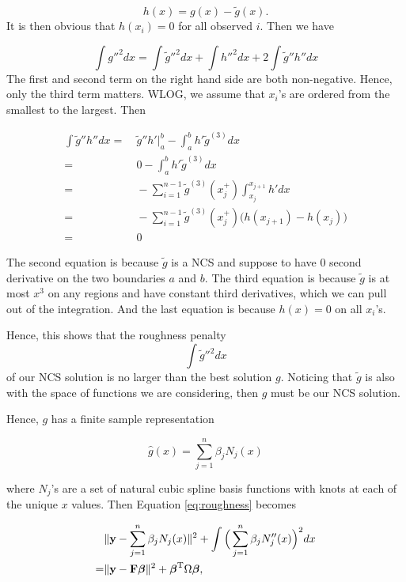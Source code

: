 \documentclass[
]{book}
\def\bF{{\bf F}}
\theoremstyle{definition}
\theoremstyle{definition}
\theoremstyle{definition}
\theoremstyle{definition}
\theoremstyle{remark}
\begin{document}
\[h(x) = g(x) - \tilde{g}(x).\]
It is then obvious that \(h(x_i) = 0\) for all observed \(i\). Then we have

\[\int g''^2 dx = \int \widetilde{g}''^2 dx + \int h''^2 dx + 2 \int \widetilde{g}'' h'' dx\]
The first and second term on the right hand side are both non-negative. Hence, only the third term matters. WLOG, we assume that \(x_i\)'s are ordered from the smallest to the largest. Then

\begin{align}
\int \tilde{g}'' h'' dx =& ~\tilde{g}'' h' \Big|_a^b - \int_a^b h' \tilde{g}^{(3)} dx \nonumber \\
=&~ 0 - \int_a^b h' \tilde{g}^{(3)} dx \nonumber \\
=&~ - \sum_{i=1}^{n-1} \tilde{g}^{(3)}(x_j^+) \int_{x_j}^{x_{j+1}} h' dx \quad \nonumber \\
=&~ - \sum_{i=1}^{n-1} \tilde{g}^{(3)}(x_j^+) \big(h(x_{j+1}) - h(x_j)\big) \nonumber \\
=&~ 0 
\end{align}

The second equation is because \(\tilde{g}\) is a NCS and suppose to have 0 second derivative on the two boundaries \(a\) and \(b\). The third equation is because \(\tilde{g}\) is at most \(x^3\) on any regions and have constant third derivatives, which we can pull out of the integration. And the last equation is because \(h(x) = 0\) on all \(x_i\)'s.

Hence, this shows that the roughness penalty \[\int \widetilde{g}''^2 dx\] of our NCS solution is no larger than the best solution \(g\). Noticing that \(\widetilde{g}\) is also with the space of functions we are considering, then \(g\) must be our NCS solution.

Hence, \(g\) has a finite sample representation

\[\widehat g(x) = \sum_{j=1}^n \beta_j N_j(x)\]

where \(N_j\)'s are a set of natural cubic spline basis functions with knots at each of the unique \(x\) values. Then Equation \eqref{eq:roughness} becomes

\begin{align}
& \lVert \mathbf{y}- \sum_{j=1}^n \beta_j N_j(x) \rVert^2 + \int \Big( \sum_{j=1}^n \beta_j N_j''(x)\Big)^2 dx \\
=& \lVert \mathbf{y}- \bF\boldsymbol \beta\rVert^2 + \boldsymbol \beta^\text{T}\Omega \boldsymbol \beta,
\end{align}
\end{document}
